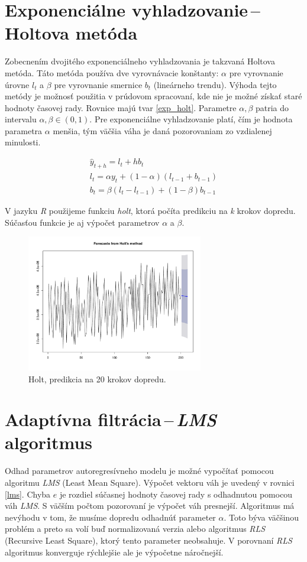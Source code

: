\documentclass[12pt,a4paper,oneside,final]{article}
\theoremstyle{definition}
\theoremstyle{remark}
\numberwithin{equation}{section}
\begin{document}
\section{Exponenciálne vyhladzovanie\,--\,Holtova metóda}
Zobecnením dvojitého exponenciálneho vyhladzovania je takzvaná Holtova metóda.
Táto metóda používa dve vyrovnávacie konštanty: $\alpha$ pre vyrovnanie úrovne $l_t$
a $\beta$ pre vyrovnanie smernice $b_t$ (lineárneho trendu).
Výhoda tejto metódy je možnosť použitia v prúdovom spracovaní, kde nie je možné získať staré hodnoty časovej rady. 
Rovnice majú tvar \ref{exp_holt}. Parametre $\alpha, \beta$ patria do intervalu 
$\alpha,\beta \in (0,1)$. Pre exponenciálne vyhladzovanie platí, 
čím je hodnota parametra $\alpha$ menšia, tým väčšia váha je daná pozorovaniam zo
vzdialenej minulosti.

\begin{eqnarray} \label{exp_holt}
    \hat{y}_{t+h} = l_{t} + hb_{t} \\
    \nonumber l_t = \alpha y_t + (1 - \alpha) (l_{t-1} + b_{t-1}) \\
    \nonumber b_t = \beta (l_t - l_{t-1}) + (1 - \beta)b_{t-1} 
\end{eqnarray}
 
V jazyku \emph{R} použijeme funkciu \emph{holt}, ktorá počíta predikciu na \emph{k} krokov 
dopredu. Súčasťou funkcie je aj výpočet parametrov $\alpha$ a $\beta$.

\begin{figure}[H]
    \begin{center}
        \includegraphics[width=.8\textwidth,height=6cm]{images/heap_holt.pdf}
        \caption{Holt, predikcia na 20 krokov dopredu.}
        \label{obr:heap_holt}
    \end{center}
\end{figure}

\section{Adaptívna filtrácia\,--\,\emph{LMS} algoritmus}
Odhad parametrov autoregresívneho modelu je možné vypočítať 
pomocou algoritmu \emph{LMS} (Least Mean Square). Výpočet vektoru váh je uvedený v
rovnici \ref{lms}. Chyba $e$ je rozdiel súčasnej hodnoty časovej rady s odhadnutou pomocou
váh \emph{LMS}. S väčším počtom pozorovaní je výpočet váh presnejší. Algoritmus 
má nevýhodu v tom, že musíme dopredu odhadnúť parameter $\alpha$. Toto býva väčšinou problém 
a preto sa volí buď normalizovaná verzia alebo algoritmus \emph{RLS} (Recursive Least
Square), ktorý tento parameter neobsahuje. V porovnaní \emph{RLS} algoritmus konverguje
rýchlejšie ale je výpočetne náročnejší.  
\end{document}
